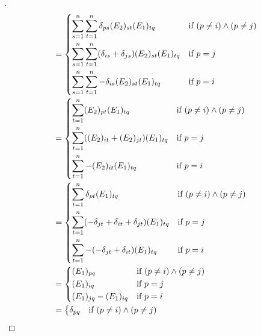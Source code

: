 \begin{proof}[]
\begin{align*}
     & = \begin{dcases}
           \sum_{s = 1}^n \sum_{t = 1}^n \delta_{p s} (E_2)_{s t} (E_1)_{t q}                  & \text{if } (p \neq i) \land (p \neq j) \\
           \sum_{s = 1}^n \sum_{t = 1}^n (\delta_{i s} + \delta_{j s}) (E_2)_{s t} (E_1)_{t q} & \text{if } p = j                       \\
           \sum_{s = 1}^n \sum_{t = 1}^n -\delta_{i s} (E_2)_{s t} (E_1)_{t q}                 & \text{if } p = i
         \end{dcases}                  \\
     & = \begin{dcases}
           \sum_{t = 1}^n (E_2)_{p t} (E_1)_{t q}                 & \text{if } (p \neq i) \land (p \neq j) \\
           \sum_{t = 1}^n ((E_2)_{i t} + (E_2)_{j t}) (E_1)_{t q} & \text{if } p = j                       \\
           \sum_{t = 1}^n -(E_2)_{i t} (E_1)_{t q}                & \text{if } p = i
         \end{dcases}                                               \\
     & = \begin{dcases}
           \sum_{t = 1}^n \delta_{p t} (E_1)_{t q}                                  & \text{if } (p \neq i) \land (p \neq j) \\
           \sum_{t = 1}^n (-\delta_{j t} + \delta_{i t} + \delta_{j t}) (E_1)_{t q} & \text{if } p = j                       \\
           \sum_{t = 1}^n -(-\delta_{j t} + \delta_{i t}) (E_1)_{t q}               & \text{if } p = i
         \end{dcases}                             \\
     & = \begin{dcases}
           (E_1)_{p q}               & \text{if } (p \neq i) \land (p \neq j) \\
           (E_1)_{i q}               & \text{if } p = j                       \\
           (E_1)_{j q} - (E_1)_{i q} & \text{if } p = i
         \end{dcases}                                                                            \\
     & = \begin{dcases}
           \delta_{p q}                               & \text{if } (p \neq i) \land (p \neq j) \\

\end{dcases}
\end{align*}
\end{proof}
